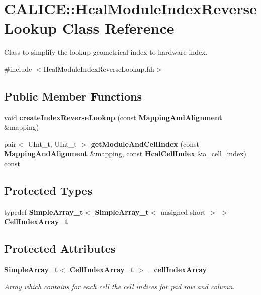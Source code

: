 \section{CALICE::HcalModuleIndexReverseLookup Class Reference}
\label{classCALICE_1_1HcalModuleIndexReverseLookup}


Class to simplify the lookup geometrical index to hardware index.  


{\ttfamily \#include $<$HcalModuleIndexReverseLookup.hh$>$}\subsection*{Public Member Functions}
\begin{DoxyCompactItemize}
\item 
void {\bfseries createIndexReverseLookup} (const {\bf MappingAndAlignment} \&mapping)\label{classCALICE_1_1HcalModuleIndexReverseLookup_a03bfcfc65304f8f75efd7108c39cd7ee}

\item 
pair$<$ UInt\_\-t, UInt\_\-t $>$ {\bfseries getModuleAndCellIndex} (const {\bf MappingAndAlignment} \&mapping, const {\bf HcalCellIndex} \&a\_\-cell\_\-index) const \label{classCALICE_1_1HcalModuleIndexReverseLookup_a1e5edb46e871ee9ac4b260385de6282d}

\end{DoxyCompactItemize}
\subsection*{Protected Types}
\begin{DoxyCompactItemize}
\item 
typedef {\bf SimpleArray\_\-t}$<$ {\bf SimpleArray\_\-t}$<$ unsigned short $>$ $>$ {\bfseries CellIndexArray\_\-t}\label{classCALICE_1_1HcalModuleIndexReverseLookup_acfe7ef8150b7fc889aee587be5a9ff95}

\end{DoxyCompactItemize}
\subsection*{Protected Attributes}
\begin{DoxyCompactItemize}
\item 
{\bf SimpleArray\_\-t}$<$ {\bf CellIndexArray\_\-t} $>$ {\bf \_\-cellIndexArray}
\begin{DoxyCompactList}\small\item\em Array which contains for each cell the cell indices for pad row and column. \item\end{DoxyCompactList}\end{DoxyCompactItemize}


